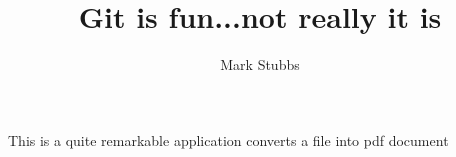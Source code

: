 \documentclass[10pt]{article}
\author{Mark Stubbs}
\title{Git is fun...not really it is}
\begin{document}
        \maketitle

        This is a quite remarkable application
        converts a file into pdf document
\end{document}
